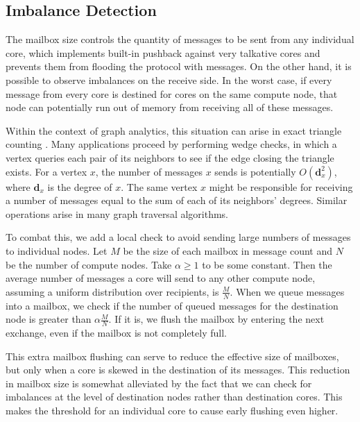 \documentclass[10]{report}
\begin{document}
\subsection{Imbalance Detection} 
\label{async:sec:imbalance}

The mailbox size controls the quantity of messages to be sent from any individual core, which implements built-in pushback against very talkative cores and prevents them from flooding the protocol with messages.
On the other hand, it is possible to observe imbalances on the receive side. 
In the worst case, if every message from every core is destined for cores on the same compute node, that node can potentially run out of memory from receiving all of these messages.

Within the context of graph analytics, this situation can arise in exact triangle counting \cite{pearce2017triangle}. 
Many applications proceed by performing wedge checks, in which a vertex queries each pair of its neighbors to see if the edge closing the triangle exists.
For a vertex $x$, the number of messages $x$ sends is potentially $O(\mathbf{d}_x^2)$, where $\mathbf{d}_x$ is the degree of $x$. 
The same vertex $x$ might be responsible for receiving a number of messages equal to the sum of each of its neighbors' degrees.
Similar operations arise in many graph traversal algorithms.

To combat this, we add a local check to avoid sending large numbers of messages to individual nodes. 
Let $M$ be the size of each mailbox in message count and $N$ be the number of compute nodes. 
Take $\alpha \geq 1$ to be some constant. 
Then the average number of messages a core will send to any other compute node, assuming a uniform distribution over recipients, is $\frac{M}{N}$. 
When we queue messages into a mailbox, we check if the number of queued messages for the destination node is greater than $\alpha \frac{M}{N}$. 
If it is, we flush the mailbox by entering the next exchange, even if the mailbox is not completely full.

This extra mailbox flushing can serve to reduce the effective size of mailboxes, but only when a core is skewed in the destination of its messages. 
This reduction in mailbox size is somewhat alleviated by the fact that we can check for imbalances at the level of destination nodes rather than destination cores. 
This makes the threshold for an individual core to cause early flushing even higher.
\end{document}
